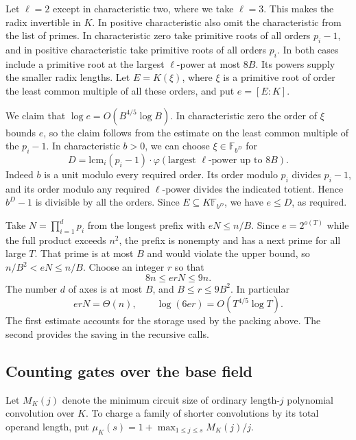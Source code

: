 Let $\ell=2$ except in characteristic two, where we take $\ell=3$.
This makes the radix invertible in $K$. In positive characteristic
also omit the characteristic from the list of primes.
In characteristic zero take primitive roots of all orders $p_i-1$,
and in positive characteristic take primitive roots of all orders $p_i$.
In both cases include a primitive root at the largest $\ell$-power
at most $8B$. Its powers supply the smaller radix lengths.
Let $E=K(\xi)$, where $\xi$ is a primitive root of order the least
common multiple of all these orders, and put $e=[E:K]$.

We claim that $\log e=O(B^{4/5}\log B)$. In characteristic zero
the order of $\xi$ bounds $e$, so the claim follows from the estimate
on the least common multiple of the $p_i-1$. In characteristic $b>0$,
we can choose $\xi\in\mathbb F_{b^D}$ for
\[
 D= \mathrm{lcm}_i(p_i-1)\cdot\varphi(\text{largest $\ell$-power up to $8B$}).
\]
Indeed $b$ is a unit modulo every required order. Its order modulo
$p_i$ divides $p_i-1$, and its order modulo any required $\ell$-power
divides the indicated totient. Hence $b^D-1$ is divisible by all the
orders. Since $E\subseteq K\mathbb F_{b^D}$, we have $e\le D$, as
required.

Take $N=\prod_{i=1}^d p_i$ from the longest prefix with
$eN\le n/B$.
Since $e=2^{o(T)}$ while the full product exceeds $n^2$, the
prefix is nonempty and has a next prime for all large $T$. That prime
is at most $B$ and would violate the upper bound, so
$n/B^2<eN\le n/B$. Choose an integer $r$ so that
\[
                8n\le erN\le 9n.
\]
The number $d$ of axes is at most $B$, and $B\le r\le9B^2$. In
particular
\[
             erN=\Theta(n),\qquad \log(6er)=O(T^{4/5}\log T).
\]
The first estimate accounts for the storage used by the packing above.
The second provides the saving in the recursive calls.

\subsection{Counting gates over the base field}

Let $M_K(j)$ denote the minimum circuit size of ordinary length-$j$
polynomial convolution over $K$. To charge a family of shorter
convolutions by its total operand length, put
$\mu_K(s)=1+\max_{1\le j\le s}M_K(j)/j$.


